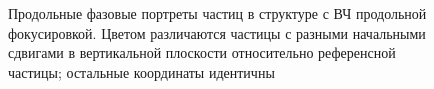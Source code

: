 \begin{figure}[H]\centering
	\caption{Продольные фазовые портреты частиц в структуре с ВЧ продольной фокусировкой. Цветом различаются частицы с разными начальными сдвигами в вертикальной плоскости относительно референсной частицы; остальные координаты идентичны}
\end{figure}